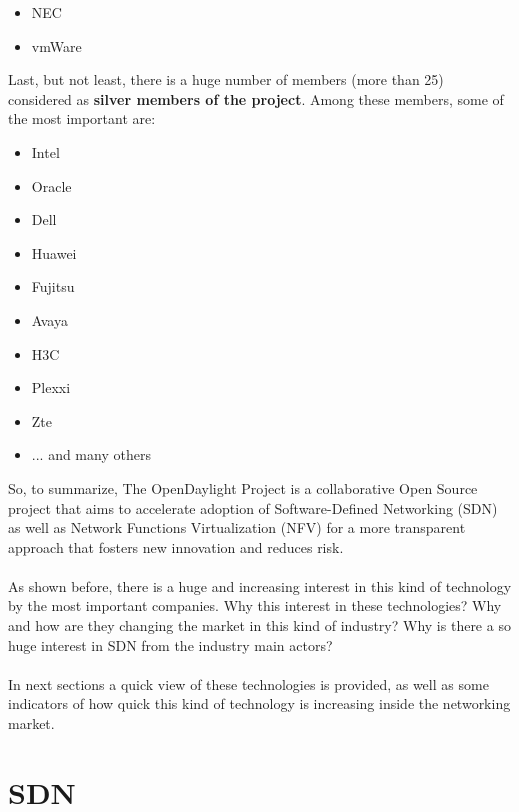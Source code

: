 \documentclass[a4paper, 12pt]{book}
\begin{document}
\begin{itemize}\itemsep0pt
 \item NEC
 \item vmWare
\end{itemize}
Last, but not least, there is a huge number of members (more than 25) considered as \textbf{silver members of the project}. Among these members, some of the most important are:
\begin{itemize}\itemsep0pt
 \item Intel
 \item Oracle
 \item Dell
 \item Huawei
 \item Fujitsu
 \item Avaya
 \item H3C
 \item Plexxi
 \item Zte
 \item ... and many others
\end{itemize}
So, to summarize, The OpenDaylight Project is a collaborative Open Source project that aims to accelerate adoption of Software-Defined Networking (SDN) as well as Network Functions Virtualization (NFV) for a more transparent approach that fosters new innovation and reduces risk.\\
\\
As shown before, there is a huge and increasing interest in this kind of technology by the most important companies. Why this interest in these technologies? Why and how are they changing the market in this kind of industry? Why is there a so huge interest in SDN from the industry main actors?\\
\\
In next sections a quick view of these technologies is provided, as well as some indicators of how quick this kind of technology is increasing inside the networking market.

\section{SDN}
\label{sec:sdn}
\end{document}
